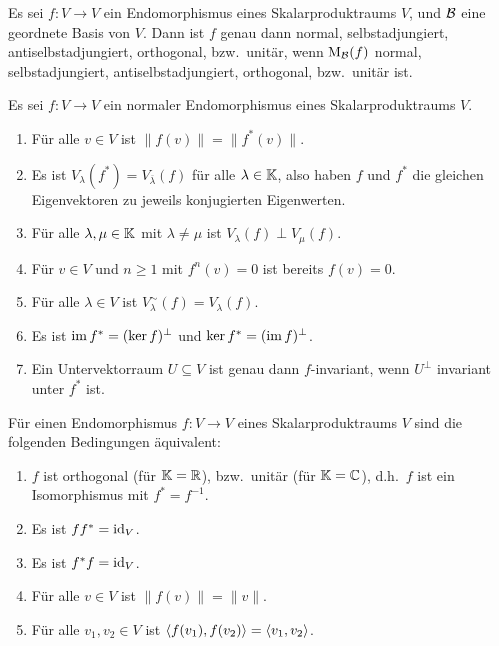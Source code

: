 \begin{lemma}
  Es sei $f \colon V \to V$ ein Endomorphismus eines Skalarproduktraums $V$, und $\mathcal{B}$ eine geordnete Basis von $V$.
  Dann ist $f$ genau dann normal, selbstadjungiert, antiselbstadjungiert, orthogonal, bzw.\ unitär, wenn $\mathrm{M}_{\mathcal{B}}(f)$ normal, selbstadjungiert, antiselbstadjungiert, orthogonal, bzw.\ unitär ist.
\end{lemma}


\begin{proposition}
  Es sei $f \colon V \to V$ ein normaler Endomorphismus eines Skalarproduktraums $V$.
  \begin{enumerate}[leftmargin=*, label=\roman*)]
    \item
      Für alle $v \in V$ ist $\|f(v)\| = \|f^*(v)\|$.
    \item
      Es ist $V_\lambda(f^*) = V_{\overline{\lambda}}(f)$ für alle $\lambda \in \mathbb{K}$, also haben $f$ und $f^*$ die gleichen Eigenvektoren zu jeweils konjugierten Eigenwerten.
    \item
      Für alle $\lambda, \mu \in \mathbb{K}$ mit $\lambda \neq \mu$ ist $V_\lambda(f) \perp V_\mu(f)$.
    \item
      Für $v \in V$ und $n \geq 1$ mit $f^n(v) = 0$ ist bereits $f(v) = 0$.
    \item
      Für alle $\lambda \in V$ ist $V^\sim_\lambda(f) = V_\lambda(f)$.
    \item
      Es ist $\operatorname{im} f^* = (\ker f)^\perp$ und $\ker f^* = (\operatorname{im} f)^\perp$.
    \item
      Ein Untervektorraum $U \subseteq V$ ist genau dann $f$-invariant, wenn $U^\perp$ invariant unter $f^*$ ist.
  \end{enumerate}
\end{proposition}


\begin{proposition}
  Für einen Endomorphismus $f \colon V \to V$ eines Skalarproduktraums $V$ sind die folgenden Bedingungen äquivalent:
  \begin{enumerate}[leftmargin=*, label=\roman*)]
    \item
      $f$ ist orthogonal (für $\mathbb{K} = \mathbb{R}$), bzw.\ unitär (für $\mathbb{K} = \mathbb{C}$), d.h.\ $f$ ist ein Isomorphismus mit $f^* = f^{-1}$.
    \item
      Es ist $f f^* = \operatorname{id}_V$.
    \item
      Es ist $f^* f = \operatorname{id}_V$.
    \item
      Für alle $v \in V$ ist $\|f(v)\| = \|v\|$.
    \item
      Für alle $v_1, v_2 \in V$ ist $\left\langle f(v_1), f(v_2) \right\rangle = \left\langle v_1, v_2 \right\rangle$.
  \end{enumerate}
\end{proposition}


